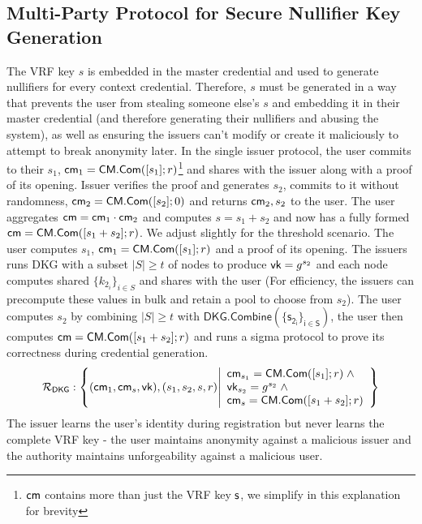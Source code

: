 \subsection{Multi-Party Protocol for Secure Nullifier Key Generation}\label{t-siris:vrf-key-k-gen}
The VRF key $s$ is embedded in the master credential and used to generate nullifiers for every context credential. Therefore, $s$ must be generated in a way that prevents the user from stealing someone else's $s$ and embedding it in their master credential (and therefore generating their nullifiers and abusing the system), as well as ensuring the issuers can't modify or create it maliciously to attempt to break anonymity later.
In the single issuer protocol, the user commits to their $s_1$, $\mathsf{cm}_1 = \mathsf{CM.Com}([s_1];r)$\footnote{$\mathsf{cm}$ contains more than just the VRF key $\mathsf{s}$, we simplify in this explanation for brevity} and shares with the issuer along with a proof of its opening. Issuer verifies the proof and generates $s_2$, commits to it without randomness, $\mathsf{cm}_2 = \mathsf{CM.Com}([s_2];0)$ and returns $\mathsf{cm}_2, s_2$ to the user. The user aggregates $\mathsf{cm} = \mathsf{cm}_1 \cdot \mathsf{cm}_2$ and computes $s =  s_1 + s_2$ and now has a fully formed $\mathsf{cm} = \mathsf{CM.Com}([s_1 + s_2];r)$.
We adjust slightly for the threshold scenario. 
The user computes $s_1$, $\mathsf{cm}_1 = \mathsf{CM.Com}([s_1];r)$ and a proof of its opening.
The issuers runs DKG with a subset  $|S| \geq t$ of nodes to produce $\mathsf{vk} = g^{s_2}$ and each node computes shared $\{k_{2_i}\}_{i \in S}$ and shares with the user (For efficiency, the issuers can precompute these values in bulk and retain a pool to choose from $s_2$).
The user computes $s_2$ by combining $|S| \geq t$ with $\mathsf{DKG.Combine(\{s_{2_i}\}_{i \in S})}$, the user then computes $\mathsf{cm} = \mathsf{CM.Com}([s_1 + s_2];r)$ and runs a sigma protocol to prove its correctness during credential generation. 
\[
\mathcal{R}_{\mathsf{DKG}}: \left\{ 
(\mathsf{cm}_1, \mathsf{cm}_s, \mathsf{vk}),(s_1, s_2, s, r) 
\middle| 
\begin{array}{lcl}
    \mathsf{cm}_{s_1} = \mathsf{CM.Com}([s_1];r) \; \wedge \; \\
    \mathsf{vk}_{s_2} = g^{s_2} \; \wedge \; \\
    \mathsf{cm}_s = \mathsf{CM.Com}([s_1 + s_2];r)
\end{array} \right\}
\]
The issuer learns the user's identity during registration but never learns the complete VRF key - the user maintains anonymity against a malicious issuer and the authority maintains unforgeability against a malicious user.

